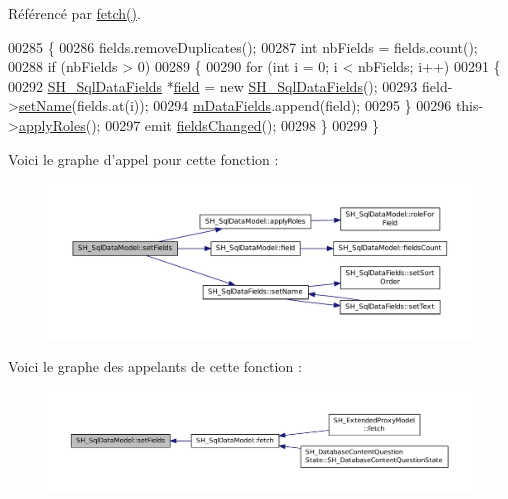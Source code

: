 Référencé par \hyperlink{classSH__SqlDataModel_a8d9b08d282a304945b9ee2f474020980}{fetch()}.


\begin{DoxyCode}
00285 \{
00286     fields.removeDuplicates();
00287     \textcolor{keywordtype}{int} nbFields = fields.count();
00288     \textcolor{keywordflow}{if} (nbFields > 0)
00289     \{
00290         \textcolor{keywordflow}{for} (\textcolor{keywordtype}{int} i = 0; i < nbFields; i++)
00291         \{
00292             \hyperlink{classSH__SqlDataFields}{SH\_SqlDataFields} *\hyperlink{classSH__SqlDataModel_a442cdea9007cb61ed9d2fbdd01ddccbf}{field} = \textcolor{keyword}{new} \hyperlink{classSH__SqlDataFields}{SH\_SqlDataFields}();
00293             field->\hyperlink{classSH__SqlDataFields_ab658a817f459e5d0a8c0f5c4e8c28a9d}{setName}(fields.at(i));
00294             \hyperlink{classSH__SqlDataModel_a3e998f75dd5b3193783612002461888d}{mDataFields}.append(field);
00295         \}
00296         this->\hyperlink{classSH__SqlDataModel_a2e529bea67d6b31d8eb4723a81a1b354}{applyRoles}();
00297         emit \hyperlink{classSH__SqlDataModel_aca80a3b90b76f217e2878f99607c78ed}{fieldsChanged}();
00298     \}
00299 \}
\end{DoxyCode}


Voici le graphe d'appel pour cette fonction \-:
\nopagebreak
\begin{figure}[H]
\begin{center}
\leavevmode
\includegraphics[width=350pt]{classSH__SqlDataModel_a1a345d536e6e08a03cb333351ce677af_cgraph}
\end{center}
\end{figure}




Voici le graphe des appelants de cette fonction \-:
\nopagebreak
\begin{figure}[H]
\begin{center}
\leavevmode
\includegraphics[width=350pt]{classSH__SqlDataModel_a1a345d536e6e08a03cb333351ce677af_icgraph}
\end{center}
\end{figure}


